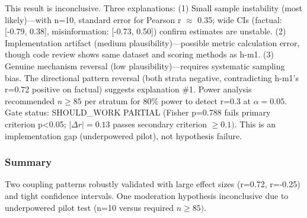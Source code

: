 This result is inconclusive. Three explanations: (1) Small sample instability (most likely)---with n=10, standard error for Pearson r $\approx$ 0.35; wide CIs (factual: [-0.79, 0.38], misinformation: [-0.73, 0.50]) confirm estimates are unstable. (2) Implementation artifact (medium plausibility)---possible metric calculation error, though code review shows same dataset and scoring methods as h-m1. (3) Genuine mechanism reversal (low plausibility)---requires systematic sampling bias. The directional pattern reversal (both strata negative, contradicting h-m1's r=0.72 positive on factual) suggests explanation \#1. Power analysis recommended $n\geq 85$ per stratum for 80\% power to detect r=0.3 at $\alpha =0.05$. Gate status: SHOULD\_WORK PARTIAL (Fisher p=0.788 fails primary criterion p<0.05; |$\Delta r|=0.13$ passes secondary criterion $\geq 0.1)$. This is an implementation gap (underpowered pilot), not hypothesis failure.

\subsubsection{Summary}

\begin{table}[htbp]
\centering
{}
\end{table}

Two coupling patterns robustly validated with large effect sizes (r=0.72, r=-0.25) and tight confidence intervals. One moderation hypothesis inconclusive due to underpowered pilot test (n=10 versus required $n\geq 85)$.

